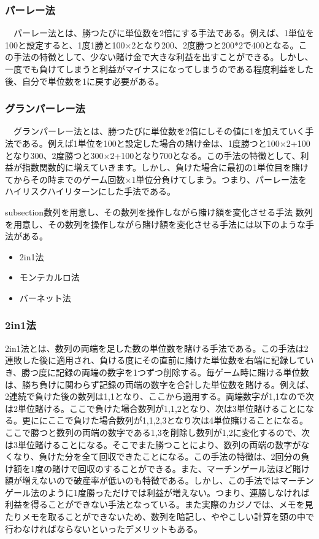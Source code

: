 \subsubsection{パーレー法}  
　パーレー法とは、勝つたびに単位数を2倍にする手法である。例えば、1単位を100と設定すると、1度1勝と100×2となり200、2度勝つと200*2で400となる。この手法の特徴として、少ない賭け金で大きな利益を出すことができる。しかし、一度でも負けてしまうと利益がマイナスになってしまうのである程度利益をした後、自分で単位数を1に戻す必要がある。
\subsubsection{グランパーレー法}  
　グランパーレー法とは、勝つたびに単位数を2倍にしその値に1を加えていく手法である。例えば1単位を100と設定した場合の賭け金は、1度勝つと100×2+100となり300、2度勝つと300×2+100となり700となる。この手法の特徴として、利益が指数関数的に増えていきます。しかし、負けた場合に最初の1単位目を賭けてからその時までのゲーム回数×1単位分負けてしまう。つまり、パーレー法をハイリスクハイリターンにした手法である。

subsection{数列を用意し、その数列を操作しながら賭け額を変化させる手法}
 数列を用意し、その数列を操作しながら賭け額を変化させる手法には以下のような手法がある。
  \begin{itemize}
 \item 2in1法
 \item モンテカルロ法
 \item バーネット法
 \end{itemize}
\subsubsection{2in1法}  
2in1法とは、数列の両端を足した数の単位数を賭ける手法である。この手法は2連敗した後に適用され、負ける度にその直前に賭けた単位数を右端に記録していき、勝つ度に記録の両端の数字を1つずつ削除する。毎ゲーム時に賭ける単位数は、勝ち負けに関わらず記録の両端の数字を合計した単位数を賭ける。例えば、2連続で負けた後の数列は{1,1}となり、ここから適用する。両端数字が1,1なので次は2単位賭ける。ここで負けた場合数列が{1,1,2}となり、次は3単位賭けることになる。更ににここで負けた場合数列が{1,1,2,3}となり次は4単位賭けることになる。ここで勝つと数列の両端の数字である1,3を削除し数列が{1,2}に変化するので、次は3単位賭けることになる。そこでまた勝つことにより、数列の両端の数字がなくなり、負けた分を全て回収できたことになる。この手法の特徴は、2回分の負け額を1度の賭けで回収のすることができる。また、マーチンゲール法ほど賭け額が増えないので破産率が低いのも特徴である。しかし、この手法ではマーチンゲール法のように1度勝っただけでは利益が増えない。つまり、連勝しなければ利益を得ることができない手法となっている。また実際のカジノでは、メモを見たりメモを取ることができないため、数列を暗記し、ややこしい計算を頭の中で行わなければならないといったデメリットもある。

